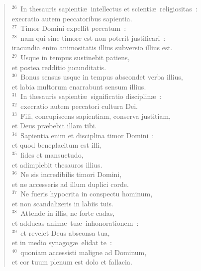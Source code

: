 \begin{flushleft}
\begin{verse}
${}^{26}$~In thesauris sapienti\ae\ intellectus et scienti\ae\ religiositas~:\\ execratio autem peccatoribus sapientia.\\
${}^{27}$~Timor Domini expellit peccatum~:\\
${}^{28}$~nam qui sine timore est non poterit justificari~:\\ iracundia enim animositatis illius subversio illius est.\\
${}^{29}$~Usque in tempus sustinebit patiens,\\ et postea redditio jucunditatis.\\
${}^{30}$~Bonus sensus usque in tempus abscondet verba illius,\\ et labia multorum enarrabunt sensum illius.\\
${}^{31}$~In thesauris sapienti\ae\ significatio disciplin\ae~:\\
${}^{32}$~execratio autem peccatori cultura Dei.\\
${}^{33}$~Fili, concupiscens sapientiam, conserva justitiam,\\ et Deus pr\ae bebit illam tibi.\\
${}^{34}$~Sapientia enim et disciplina timor Domini~:\\ et quod beneplacitum est illi,\\
${}^{35}$~fides et mansuetudo,\\ et adimplebit thesauros illius.\\
${}^{36}$~Ne sis incredibilis timori Domini,\\ et ne accesseris ad illum duplici corde.\\
${}^{37}$~Ne fueris hypocrita in conspectu hominum,\\ et non scandalizeris in labiis tuis.\\
${}^{38}$~Attende in illis, ne forte cadas,\\ et adducas anim\ae\ tu\ae\ inhonorationem~:\\
${}^{39}$~et revelet Deus absconsa tua,\\ et in medio synagog\ae\ elidat te~:\\
${}^{40}$~quoniam accessisti maligne ad Dominum,\\ et cor tuum plenum est dolo et fallacia.\end{verse}\end{flushleft}


